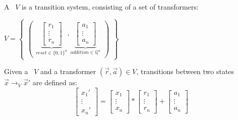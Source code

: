 \begin{frame}[t]
	\frametitle{\qvasr}
	\begin{definition}
		A \qvasr\ $V$ is a transition system, consisting of a set of transformers: \\
		\begin{center}
			$ V = 
			\begin{Bmatrix}
				\begin{pmatrix}
					\underbrace{
						\begin{bmatrix}
							r_1 \\
							\vdots \\
							r_n
					\end{bmatrix}}_{reset \in \{0,1\}^n},
					\underbrace{
						\begin{bmatrix}
							a_1 \\
							\vdots \\
							a_n
					\end{bmatrix}}_{addition \in \mathbb{Q}^n}
				\end{pmatrix}
			\end{Bmatrix}
			$
		\end{center}
	\end{definition}
	\begin{definition}
		Given a \qvasr\ $V$ and a transformer $(\vec{r}, \vec{a}) \in V$, transitions between two states $\vec{x} \rightarrow_V \vec{x}'$ are defined as: \\
		\begin{equation*}
			\begin{bmatrix}
				x_1' \\
				\vdots \\
				x_n'
			\end{bmatrix}
			=
			\begin{bmatrix}
				x_1 \\
				\vdots \\
				x_n
			\end{bmatrix}
			*
			\begin{bmatrix}
				r_1 \\
				\vdots \\
				r_n
			\end{bmatrix}
			+
			\begin{bmatrix}
				a_1 \\
				\vdots \\
				a_n
			\end{bmatrix}		
		\end{equation*}
	\end{definition}
\end{frame}